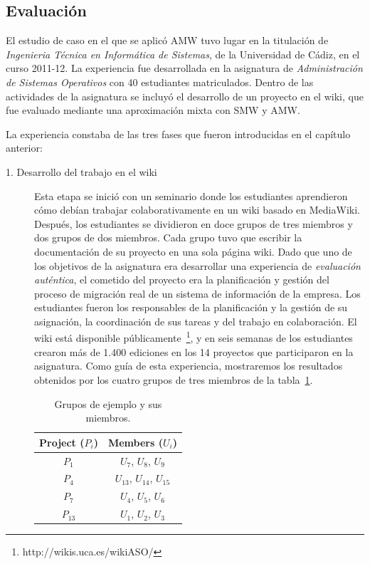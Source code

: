 \subsection{Evaluación}

El estudio de caso en el que se aplicó AMW tuvo lugar en la titulación de \emph{Ingenieria Técnica en Informática de Sistemas},  de la Universidad de Cádiz, en el curso 2011-12. La experiencia fue desarrollada en la asignatura de \emph{Administración de Sistemas Operativos} con 40 estudiantes matriculados. Dentro de las actividades de la asignatura se incluyó el desarrollo de un proyecto en el wiki, que fue evaluado mediante una aproximación mixta con SMW y AMW.

La experiencia constaba de las tres fases que fueron introducidas en el capítulo anterior:

\begin{description}
\item[1. Desarrollo del trabajo en el wiki]

Esta etapa se inició con un seminario donde los estudiantes aprendieron cómo debían trabajar colaborativamente en un wiki basado en MediaWiki. Después, los estudiantes se dividieron en doce grupos de tres miembros y dos grupos de dos miembros. Cada grupo tuvo que escribir la documentación de su proyecto en una sola página wiki. Dado que uno de los objetivos de la asignatura era desarrollar una experiencia de \emph{evaluación auténtica}, el cometido del proyecto era la planificación y gestión del proceso de migración real de un sistema de información de la empresa. Los estudiantes fueron los responsables de la planificación y la gestión de su asignación, la coordinación de sus tareas y del trabajo en colaboración. El wiki está disponible públicamente~\footnote{http://wikis.uca.es/wikiASO/}, y en seis semanas de los estudiantes crearon más de 1.400 ediciones en los 14 proyectos que participaron en la asignatura. Como guía de esta experiencia, mostraremos los resultados obtenidos por los cuatro grupos de tres miembros de la tabla~\ref {tab:AmwGroupsMembers}.

\begin{table}[h]
\centering
\begin{tabular}{|c|c|}
\hline
\textbf{Project ($P_i$)} & \textbf{Members ($U_i$)}   \\ \hline
\hline
 $P_1$ & $U_7$, $U_8$, $U_9$  \\ \hline
 $P_4$ & $U_{13}$, $U_{14}$, $U_{15}$  \\ \hline
 $P_7$ & $U_4$, $U_5$, $U_6$  \\ \hline
 $P_{13}$ & $U_1$, $U_2$, $U_3$  \\ \hline
\end{tabular}
\caption{Grupos de ejemplo y sus miembros.}
\label{tab:AmwGroupsMembers}
\end{table}


\end{description}
